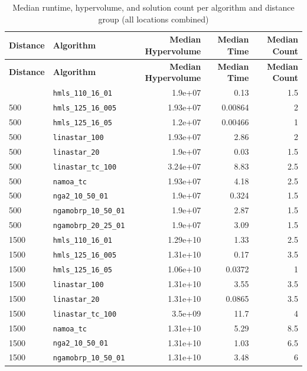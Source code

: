 \begin{longtable}{|l|l|r|r|r|}
    \caption{Median runtime, hypervolume, and solution count per algorithm and distance group (all locations combined)}\\
    \hline
    \textbf{Distance} & \textbf{Algorithm} & \textbf{Median Hypervolume} & \textbf{Median Time} & \textbf{Median Count} \\
    \hline\endfirsthead
    \hline
    \textbf{Distance} & \textbf{Algorithm} & \textbf{Median Hypervolume} & \textbf{Median Time} & \textbf{Median Count} \\
    \hline\endhead
    \hline\endfoot
    \hline\endlastfoot
    500 & \texttt{hmls\_110\_16\_01} & 1.9e+07 & 0.13 & 1.5 \\
    500 & \texttt{hmls\_125\_16\_005} & 1.93e+07 & 0.00864 & 2 \\
    500 & \texttt{hmls\_125\_16\_05} & 1.2e+07 & 0.00466 & 1 \\
    500 & \texttt{linastar\_100} & 1.93e+07 & 2.86 & 2 \\
    500 & \texttt{linastar\_20} & 1.9e+07 & 0.03 & 1.5 \\
    500 & \texttt{linastar\_tc\_100} & 3.24e+07 & 8.83 & 2.5 \\
    500 & \texttt{namoa\_tc} & 1.93e+07 & 4.18 & 2.5 \\
    500 & \texttt{nga2\_10\_50\_01} & 1.9e+07 & 0.324 & 1.5 \\
    500 & \texttt{ngamobrp\_10\_50\_01} & 1.9e+07 & 2.87 & 1.5 \\
    500 & \texttt{ngamobrp\_20\_25\_01} & 1.9e+07 & 3.09 & 1.5 \\
    1500 & \texttt{hmls\_110\_16\_01} & 1.29e+10 & 1.33 & 2.5 \\
    1500 & \texttt{hmls\_125\_16\_005} & 1.31e+10 & 0.17 & 3.5 \\
    1500 & \texttt{hmls\_125\_16\_05} & 1.06e+10 & 0.0372 & 1 \\
    1500 & \texttt{linastar\_100} & 1.31e+10 & 3.55 & 3.5 \\
    1500 & \texttt{linastar\_20} & 1.31e+10 & 0.0865 & 3.5 \\
    1500 & \texttt{linastar\_tc\_100} & 3.5e+09 & 11.7 & 4 \\
    1500 & \texttt{namoa\_tc} & 1.31e+10 & 5.29 & 8.5 \\
    1500 & \texttt{nga2\_10\_50\_01} & 1.31e+10 & 1.03 & 6.5 \\
    1500 & \texttt{ngamobrp\_10\_50\_01} & 1.31e+10 & 3.48 & 6 \\

\end{longtable}
